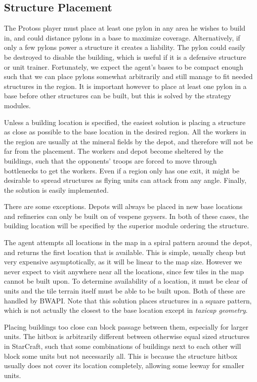 	\subsection*{Structure Placement}
	The Protoss player must place at least one pylon in any area he wishes to build in, and could distance pylons in a base to maximize coverage. Alternatively, if only a few pylons power a structure it creates a liability. The pylon could easily be destroyed to disable the building, which is useful if it is a defensive structure or unit trainer. Fortunately, we expect the agent's bases to be compact enough such that we can place pylons somewhat arbitrarily and still manage to fit needed structures in the region. It is important however to place at least one pylon in a base before other structures can be built, but this is solved by the strategy modules.
	
	Unless a building location is specified, the easiest solution is placing a structure as close as possible to the base location in the desired region. All the workers in the region are usually at the mineral fields by the depot, and therefore will not be far from the placement. The workers and depot become sheltered by the buildings, such that the opponents' troops are forced to move through bottlenecks to get the workers. Even if a region only has one exit, it might be desirable to spread structures as flying units can attack from any angle. Finally, the solution is easily implemented.
	
	There are some exceptions. Depots will always be placed in new base locations and refineries can only be built on of vespene geysers. In both of these cases, the building location will be specified by the superior module ordering the structure.

	The agent attempts all locations in the map in a spiral pattern around the depot, and returns the first location that is available. This is simple, usually cheap but very expensive asymptotically, as it will be linear to the map size. However we never expect to visit anywhere near all the locations, since few tiles in the map cannot be built upon. To determine availability of a location, it must be clear of units and the tile terrain itself must be able to be built upon. Both of these are handled by BWAPI. Note that this solution places structures in a square pattern, which is not actually the closest to the base location except in \emph{taxicap geometry}.

	Placing buildings too close can block passage between them, especially for larger units. The hitbox is arbitrarily different between otherwise equal sized structures in StarCraft, such that some combinations of buildings next to each other will block some units but not necessarily all. This is because the structure hitbox usually does not cover its location completely, allowing some leeway for smaller units.
	
